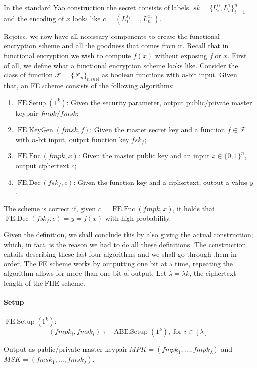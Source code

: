 \documentclass[11pt, a4paper]{article}
\newcommand{\op}[1]{\operatorname{#1}}
\begin{document}
In the standard Yao construction the secret consists of labels, $sk = \{ L_i^0, L_i^1 \}_{i=1}^n$ and the encoding of $x$ looks like $c = (L_1^{x_1}, \dots, L_n^{x_n})$.

Rejoice, we now have all necessary components to create the functional encryption scheme and all the goodness that comes from it. 
Recall that in functional encryption we wish to compute $f(x)$ without exposing $f$ or $x$. 
First of all, we define what a functional encryption scheme looks like.
Consider the class of function $\mathcal{F} = \{\mathcal{F}_n\}_{n \ in \mathbb{N}}$ as boolean functions with $n$-bit input.
Given that, an FE scheme consists of the following algorithms:
\begin{enumerate}
    \item $\op{FE.Setup}(1^k)$: Given the security parameter, output public/private master keypair $fmpk/fmsk$;
    \item $\op{FE.KeyGen}(fmsk, f)$: Given the master secret key and a function $f \in \mathcal{F}$ with $n$-bit input, output function key $fsk_f$;
    \item $\op{FE.Enc}(fmpk, x)$: Given the master public key and an input $x \in \{0,1\}^n$, output ciphertext $c$;
    \item $\op{FE.Dec}(fsk_f, c)$: Given the function key and a ciphertext, output a value $y$.
\end{enumerate}

The scheme is correct if, given $c = \op{FE.Enc}(fmpk, x)$, it holds that $\op{FE.Dec}(fsk_f, c) = y = f(x)$ with high probability.

Given the definition, we shall conclude this by also giving the actual construction; which, in fact, is the reason we had to do all these definitions.
The construction entails describing these last four algorithms and we shall go through them in order. The FE scheme works by outputting one bit at a time, repeating the algorithm allows for more than one bit of output. Let $\lambda = \lambda{k}$, the ciphertext length of the FHE scheme.

\paragraph{Setup}

$\op{FE.Setup}(1^k)$:
\[
    (fmpk_i, fmsk_i) \leftarrow \op{ABE.Setup}(1^k), \text{ for } i \in [\lambda]
\]

Output as public/private master keypair $MPK = (fmpk_1, \dots, fmpk_{\lambda})$ and $MSK = (fmsk_1, \dots, fmsk_{\lambda})$.
\end{document}
